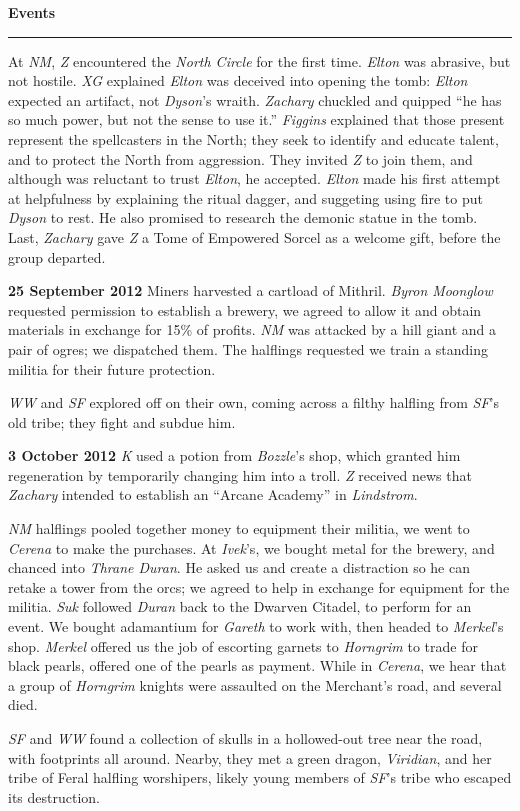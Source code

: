 \documentclass[letterpaper]{article}
\newcommand{\e}[1]{\emph{#1}}
\newcommand{\B}[1]{\textbf{#1}}
\newenvironment{notesection}[1]
{ {\huge \B{#1}}\hrule\vspace{0.5em}\begingroup\fontsize{9pt}{12pt}\selectfont}
{\endgroup}
\begin{document}
\begin{notesection}{Events}
At \e{NM}, \e{Z} encountered the \e{North Circle} for the first time. \e{Elton} was abrasive, but not hostile. \e{XG} explained \e{Elton} was deceived into opening the tomb: \emph{Elton} expected an artifact, not \e{Dyson}'s wraith.  \e{Zachary} chuckled and quipped ``he has so much power, but not the sense to use it.'' \e{Figgins} explained that those present represent the spellcasters in the North; they seek to identify and educate talent, and to protect the North from aggression. They invited \e{Z} to join them, and although was reluctant to trust \e{Elton}, he accepted. \e{Elton} made his first attempt at helpfulness by explaining the ritual dagger, and suggeting using fire to put \e{Dyson} to rest. He also promised to research the demonic statue in the tomb.  Last, \e{Zachary} gave \e{Z} a Tome of Empowered Sorcel as a welcome gift, before the group departed.

\B{25 September 2012} Miners harvested a cartload of Mithril. \e{Byron Moonglow} requested permission to establish a brewery, we agreed to allow it and obtain materials in exchange for 15\% of profits. \e{NM} was attacked by a hill giant and a pair of ogres; we dispatched them. The halflings requested we train a standing militia for their future protection.

\e{WW} and \e{SF} explored off on their own, coming across a filthy halfling from \e{SF}'s old tribe; they fight and subdue him.

\B{3 October 2012} \e{K} used a potion from \e{Bozzle}'s shop, which granted him regeneration by temporarily changing him into a troll. \e{Z} received news that \e{Zachary} intended to establish an ``Arcane Academy'' in \e{Lindstrom}.

\e{NM} halflings pooled together money to equipment their militia, we went to \e{Cerena} to make the purchases. At \e{Ivek}'s, we bought metal for the brewery, and chanced into \e{Thrane Duran}. He asked us and create a distraction so he can retake a tower from the orcs; we agreed to help in exchange for equipment for the militia. \e{Suk} followed \e{Duran} back to the Dwarven Citadel, to perform for an event. We bought adamantium for \e{Gareth} to work with, then headed to \e{Merkel}'s shop. \e{Merkel} offered us the job of escorting garnets to \e{Horngrim} to trade for black pearls, offered one of the pearls as payment. While in \e{Cerena}, we hear that a group of \e{Horngrim} knights were assaulted on the Merchant's road, and several died.

\e{SF} and \e{WW} found a collection of skulls in a hollowed-out tree near the road, with footprints all around. Nearby, they met a green dragon, \e{Viridian}, and her tribe of Feral halfling worshipers, likely young members of \e{SF}'s tribe who escaped its destruction.


\end{notesection}
\end{document}
